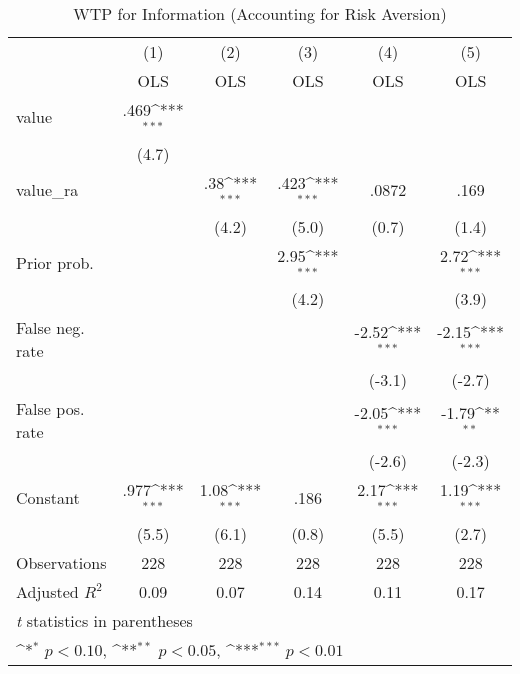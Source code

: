 \begin{table}[htbp]\centering
\def\sym#1{\ifmmode^{#1}\else\(^{#1}\)\fi}
\caption{WTP for Information (Accounting for Risk Aversion)}
\begin{tabular}{l*{5}{c}}
\hline\hline
                &\multicolumn{1}{c}{(1)}&\multicolumn{1}{c}{(2)}&\multicolumn{1}{c}{(3)}&\multicolumn{1}{c}{(4)}&\multicolumn{1}{c}{(5)}\\
                &\multicolumn{1}{c}{OLS}&\multicolumn{1}{c}{OLS}&\multicolumn{1}{c}{OLS}&\multicolumn{1}{c}{OLS}&\multicolumn{1}{c}{OLS}\\
\hline
value           &     .469\sym{***}&                  &                  &                  &                  \\
                &    (4.7)         &                  &                  &                  &                  \\
value\_ra        &                  &      .38\sym{***}&     .423\sym{***}&    .0872         &     .169         \\
                &                  &    (4.2)         &    (5.0)         &    (0.7)         &    (1.4)         \\
Prior prob.     &                  &                  &     2.95\sym{***}&                  &     2.72\sym{***}\\
                &                  &                  &    (4.2)         &                  &    (3.9)         \\
False neg. rate &                  &                  &                  &    -2.52\sym{***}&    -2.15\sym{***}\\
                &                  &                  &                  &   (-3.1)         &   (-2.7)         \\
False pos. rate &                  &                  &                  &    -2.05\sym{***}&    -1.79\sym{**} \\
                &                  &                  &                  &   (-2.6)         &   (-2.3)         \\
Constant        &     .977\sym{***}&     1.08\sym{***}&     .186         &     2.17\sym{***}&     1.19\sym{***}\\
                &    (5.5)         &    (6.1)         &    (0.8)         &    (5.5)         &    (2.7)         \\
\hline
Observations    &      228         &      228         &      228         &      228         &      228         \\
Adjusted \(R^{2}\)&     0.09         &     0.07         &     0.14         &     0.11         &     0.17         \\
\hline\hline
\multicolumn{6}{l}{\footnotesize \textit{t} statistics in parentheses}\\
\multicolumn{6}{l}{\footnotesize \sym{*} \(p<0.10\), \sym{**} \(p<0.05\), \sym{***} \(p<0.01\)}\\
\end{tabular}
\end{table}
